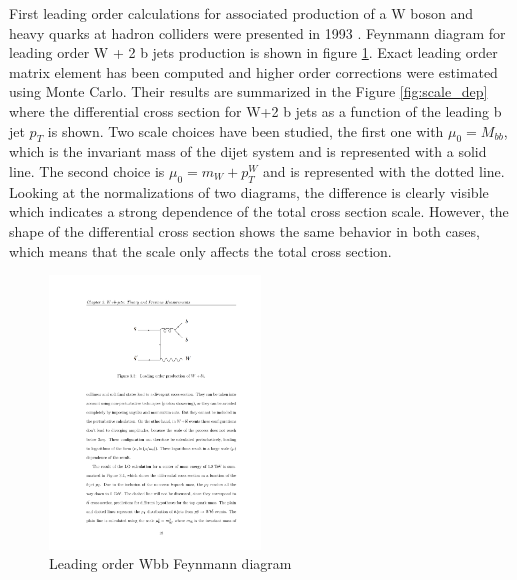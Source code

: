 \par First leading order calculations for associated production of a W boson and heavy quarks at hadron colliders were presented in 1993 \cite{Mangano:1992kp}. Feynmann diagram for leading order W + 2 b jets production is shown in figure \ref{fig:LO_diag}. Exact leading order matrix element has been computed and higher order corrections were estimated using Monte Carlo. Their results are summarized in the Figure \ref{fig:scale_dep} where the differential cross section for W+2 b jets as a function of the leading b jet $p_T$ is shown. Two scale choices have been studied, the first one with $\mu_0=M_{bb}$, which is the invariant mass of the dijet system and is represented with a solid line. The second choice is $\mu_0=m_W+p_T^W$ and is represented with the dotted line. Looking at the normalizations of two diagrams, the difference is clearly visible which indicates a strong dependence of the total cross section scale. However, the shape of the differential cross section shows the same behavior in both cases, which means that the scale only affects the total cross section.      
\begin{figure}[htbp]
	\centering
		\includegraphics[width=0.5\textwidth]{Figures/LO_diag.pdf}
	\caption[Leading order Wbb Feynmann diagram]{Leading order Wbb Feynmann diagram}
	\label{fig:LO_diag}
\end{figure}

